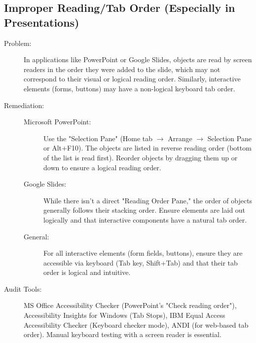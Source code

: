 \subsection{Improper Reading/Tab Order (Especially in Presentations)}
\label{subsec:tab-order}
\begin{description}
    \item[Problem:] In applications like PowerPoint or Google Slides, objects are read by screen readers in the order they were added to the slide, which may not correspond to their visual or logical reading order. Similarly, interactive elements (forms, buttons) may have a non-logical keyboard tab order.
    \item[Remediation:]
    \begin{description}
        \item[Microsoft PowerPoint:] Use the "Selection Pane" (Home tab $\rightarrow$ Arrange $\rightarrow$ Selection Pane or Alt+F10). The objects are listed in reverse reading order (bottom of the list is read first). Reorder objects by dragging them up or down to ensure a logical reading order.
        \item[Google Slides:] While there isn't a direct "Reading Order Pane," the order of objects generally follows their stacking order. Ensure elements are laid out logically and that interactive components have a natural tab order.
        \item[General:] For all interactive elements (form fields, buttons), ensure they are accessible via keyboard (Tab key, Shift+Tab) and that their tab order is logical and intuitive.
    \end{description}
    \item[Audit Tools:] MS Office Accessibility Checker (PowerPoint's "Check reading order"), Accessibility Insights for Windows (Tab Stops), IBM Equal Access Accessibility Checker (Keyboard checker mode), ANDI (for web-based tab order). Manual keyboard testing with a screen reader is essential.
\end{description}

